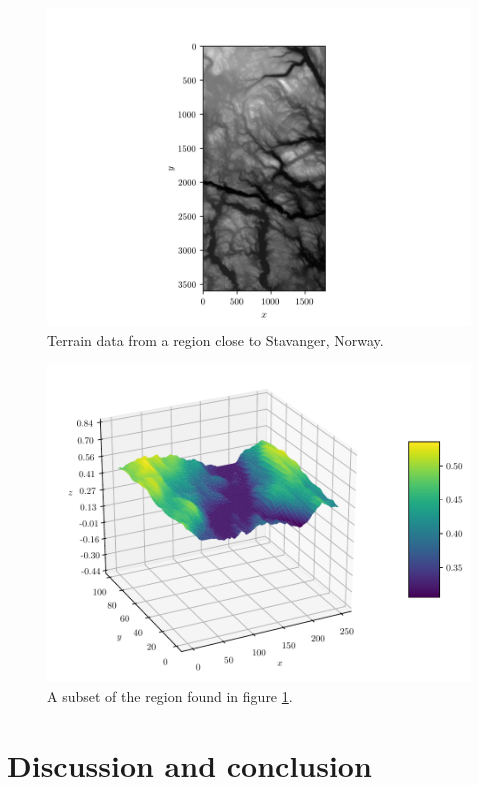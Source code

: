 \documentclass[11pt]{article}
\begin{document}
\begin{figure}
    \centering
    \includegraphics[scale=1.0]{../fig/terrain_data.png}
    \caption{Terrain data from a region close to Stavanger, Norway.}
    \label{fig:terrain_map_full}
\end{figure}

\begin{figure}
    \centering
    \includegraphics[scale=0.8]{../fig/terrain_patch.pdf}
    \caption{A subset of the region found in figure \ref{fig:terrain_map_full}.}
    \label{fig:terrain_patch}
\end{figure}



\section{Discussion and conclusion}
\end{document}
